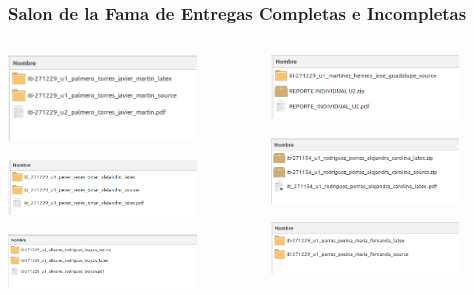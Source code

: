 \begin{frame}
\frametitle{Salon de la Fama de Entregas Completas e Incompletas}
\begin{columns}
\begin{column}{0.5\textwidth}
\begin{center}
\includegraphics[width=5cm]{Entregables/CasoBien.png}

\includegraphics[width=5cm]{Entregables/CasoBien2.png}

\includegraphics[width=5cm]{Entregables/CasoBien3.png}
\end{center}

\end{column}
\begin{column}{0.5\textwidth}
\begin{center}
\includegraphics[width=5cm]{Entregables/CasoMal1.png}

\includegraphics[width=5cm]{Entregables/CasoMal2.png}

\includegraphics[width=5cm]{Entregables/CasoMal3.png}
\end{center}

\end{column}
\end{columns}
\end{frame}



